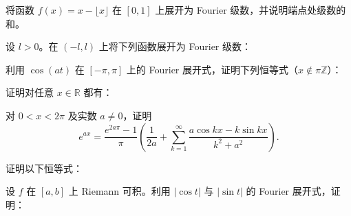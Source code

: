 \newpage
\noindent\begin{minipage}{\textwidth}
将函数 $f(x)=x-\lfloor x\rfloor$ 在 $[0,1]$ 上展开为 Fourier 级数，并说明端点处级数的和。
\end{minipage}\par\vfill
\noindent\begin{minipage}{\textwidth}
设 $l>0$。在 $(-l,l)$ 上将下列函数展开为 Fourier 级数：
\end{minipage}\par\vfill
\noindent\begin{minipage}{\textwidth}
利用 $\cos(at)$ 在 $[-\pi,\pi]$ 上的 Fourier 展开式，证明下列恒等式（$x\notin\pi\mathbb Z$）：
\end{minipage}\par\vfill
\newpage
\noindent\begin{minipage}{\textwidth}
证明对任意 $x\in\mathbb R$ 都有：
\end{minipage}\par\vfill
\noindent\begin{minipage}{\textwidth}
对 $0<x<2\pi$ 及实数 $a\ne0$，证明\[e^{ax}=\frac{e^{2a\pi}-1}\pi\left(\frac1{2a}+\sum_{k=1}^\infty\frac{a\cos kx-k\sin kx}{k^2+a^2}\right).\]
\end{minipage}\par\vfill
\noindent\begin{minipage}{\textwidth}
证明以下恒等式：
\end{minipage}\par\vfill
\newpage
\noindent\begin{minipage}{\textwidth}
设 $f$ 在 $[a,b]$ 上 Riemann 可积。利用 $|\cos t|$ 与 $|\sin t|$ 的 Fourier 展开式，证明：
\end{minipage}\par\vfill
